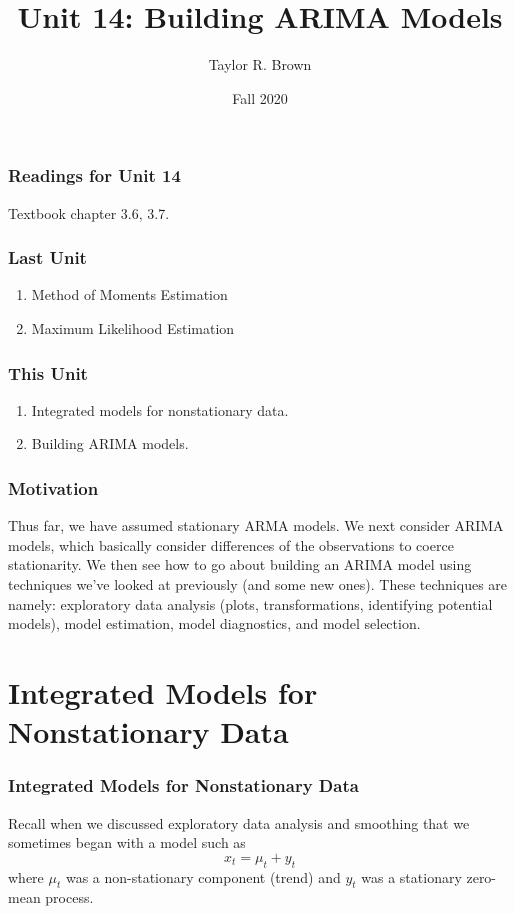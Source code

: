 \documentclass[%
xcolor=pdftex]{beamer}
\title{Unit 14: Building ARIMA Models}
\author[STAT 5170: Applied Time Series, Unit 14]{Taylor R. Brown}
\institute{Department of Statistics, University of Virginia}
\date{Fall 2020}
\begin{document}
\frame{\titlepage}


\begin{frame}
\frametitle{Readings for Unit 14}

Textbook chapter 3.6, 3.7.

\end{frame}



\begin{frame}
\frametitle{Last Unit}
\begin{enumerate}
\item Method of Moments Estimation
\item Maximum Likelihood Estimation
\end{enumerate}
\end{frame}

\begin{frame}
\frametitle{This Unit}
\begin{enumerate}
\item Integrated models for nonstationary data.
\item Building ARIMA models.
\end{enumerate}
\end{frame}


\begin{frame}
\frametitle{Motivation}

Thus far, we have assumed stationary ARMA models. We next consider ARIMA models, which basically consider differences of the observations to coerce stationarity. We then see how to go about building an ARIMA model using techniques we've looked at previously (and some new ones). These techniques are namely: exploratory data analysis (plots, transformations, identifying potential models), model estimation, model diagnostics, and model selection.

\end{frame}

\section{Integrated Models for Nonstationary Data}
\frame{\tableofcontents[currentsection]}

\begin{frame}
\frametitle{Integrated Models for Nonstationary Data}

Recall when we discussed exploratory data analysis and smoothing that we sometimes began with a model such as
 $$
 x_t=\mu_t + y_t
 $$
where $\mu_t$ was a non-stationary component (trend) and $y_t$ was a stationary zero-mean process.

\end{frame}
\end{document}
